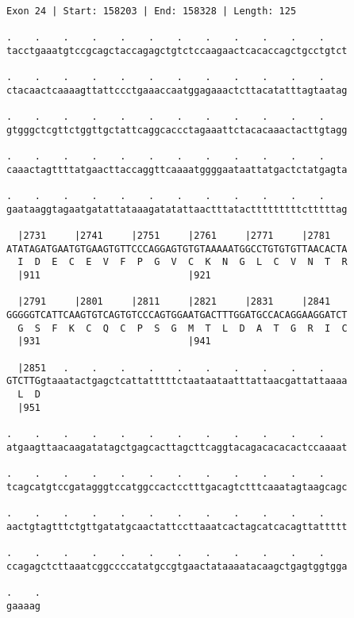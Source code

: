 \documentclass{article}
\begin{document}
\begin{Verbatim}
Exon 24 | Start: 158203 | End: 158328 | Length: 125
 
.    .    .    .    .    .    .    .    .    .    .    .    
tacctgaaatgtccgcagctaccagagctgtctccaagaactcacaccagctgcctgtct
  
.    .    .    .    .    .    .    .    .    .    .    .    
ctacaactcaaaagttattccctgaaaccaatggagaaactcttacatatttagtaatag
  
.    .    .    .    .    .    .    .    .    .    .    .    
gtgggctcgttctggttgctattcaggcaccctagaaattctacacaaactacttgtagg
  
.    .    .    .    .    .    .    .    .    .    .    .    
caaactagttttatgaacttaccaggttcaaaatggggaataattatgactctatgagta
  
.    .    .    .    .    .    .    .    .    .    .    .    
gaataaggtagaatgatattataaagatatattaactttatactttttttttctttttag
  
  |2731     |2741     |2751     |2761     |2771     |2781   
ATATAGATGAATGTGAAGTGTTCCCAGGAGTGTGTAAAAATGGCCTGTGTGTTAACACTA
  I  D  E  C  E  V  F  P  G  V  C  K  N  G  L  C  V  N  T  R
  |911                          |921                        
  
  |2791     |2801     |2811     |2821     |2831     |2841   
GGGGGTCATTCAAGTGTCAGTGTCCCAGTGGAATGACTTTGGATGCCACAGGAAGGATCT
  G  S  F  K  C  Q  C  P  S  G  M  T  L  D  A  T  G  R  I  C
  |931                          |941                        
  
  |2851   .    .    .    .    .    .    .    .    .    .    
GTCTTGgtaaatactgagctcattatttttctaataataatttattaacgattattaaaa
  L  D                                                      
  |951                                                      
  
.    .    .    .    .    .    .    .    .    .    .    .    
atgaagttaacaagatatagctgagcacttagcttcaggtacagacacacactccaaaat
  
.    .    .    .    .    .    .    .    .    .    .    .    
tcagcatgtccgatagggtccatggccactcctttgacagtctttcaaatagtaagcagc
  
.    .    .    .    .    .    .    .    .    .    .    .    
aactgtagtttctgttgatatgcaactattccttaaatcactagcatcacagttattttt
  
.    .    .    .    .    .    .    .    .    .    .    .    
ccagagctcttaaatcggccccatatgccgtgaactataaaatacaagctgagtggtgga
  
.    .
gaaaag
\end{Verbatim}
\newpage
\end{document}
